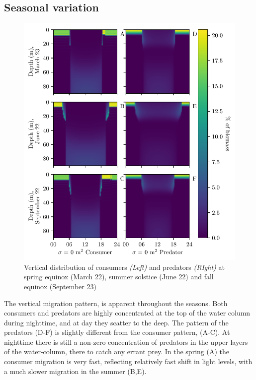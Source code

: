\subsection*{Seasonal variation}
\begin{figure}[H]
\includegraphics{plots/total_heatmap.pdf}
\caption{Vertical distribution of consumers \emph{(Left)} and predators \emph{(RIght)} at spring equinox (March 22), summer solstice (June 22) and fall equinox (September 23)}
\label{fig:heatmap_total}
\end{figure}
The vertical migration pattern,  is apparent throughout the seasons. Both consumers and predators are highly concentrated at the top of the water column during nighttime, and at day they scatter to the deep. The pattern of the predators (D-F) is slightly different from the consumer pattern,  (A-C). At nighttime there is still a non-zero concentration of predators in the upper layers of the water-column, there to catch any errant prey. In the spring (A) the consumer migration is very fast, reflecting relatively fast shift in light levels, with a much slower migration in the summer (B,E).

